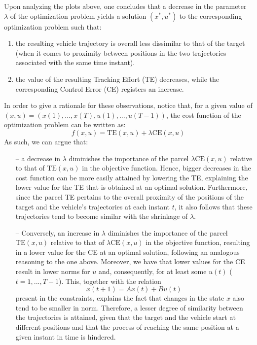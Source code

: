 \documentclass[12pt]{article}
\begin{document}
Upon analyzing the plots above, one concludes that a decrease in the parameter $\lambda$ of the optimization problem yields a solution $(x^*, u^*)$ to the corresponding optimization problem such that:
\begin{enumerate}
    \item the resulting vehicle trajectory is overall less dissimilar to that of the target (when it comes to proximity between positions in the two trajectories associated with the same time instant).
    \item the value of the resulting Tracking Effort (TE) decreases, while the corresponding Control Error (CE) registers an increase.
\end{enumerate}
In order to give a rationale for these observations, notice that, for a given value of $(x, u) = (x(1), ..., x(T), u(1), ..., u(T - 1))$, the cost function of the optimization problem can be written as:
\vspace{-0.2em}
\[
    f(x, u) = \text{TE}(x, u) + \lambda \text{CE}(x, u)
\]
As such, we can argue that:
\begin{itemize}
    \item[--] a decrease in $\lambda$ diminishes the importance of the parcel $\lambda \text{CE}(x, u)$ relative to that of $\text{TE}(x, u)$ in the objective function. Hence, bigger decreases in the cost function can be more easily attained by lowering the TE, explaining the lower value for the TE that is obtained at an optimal solution. Furthermore, since the parcel TE pertains to the overall proximity of the positions of the target and the vehicle's trajectories at each instant $t$, it also follows that these trajectories tend to become similar with the shrinkage of $\lambda$.
    \item[--] Conversely, an increase in $\lambda$ diminishes the importance of the parcel $\text{TE}(x, u)$ relative to that of $\lambda \text{CE}(x, u)$ in the objective function, resulting in a lower value for the CE at an optimal solution, following an analogous reasoning to the one above. Moreover, we have that lower values for the CE result in lower norms for $u$ and, consequently, for at least some $u(t)$ ($t = 1, ..., T-1$). This, together with the relation
    \[
        x(t + 1) = Ax(t) + Bu(t)
    \]
    present in the constraints, explains the fact that changes in the state $x$ also tend to be smaller in norm. Therefore, a lesser degree of similarity between the trajectories is attained, given that the target and the vehicle start at different positions and that the process of reaching the same position at a given instant in time is hindered.
\end{itemize}
\end{document}
